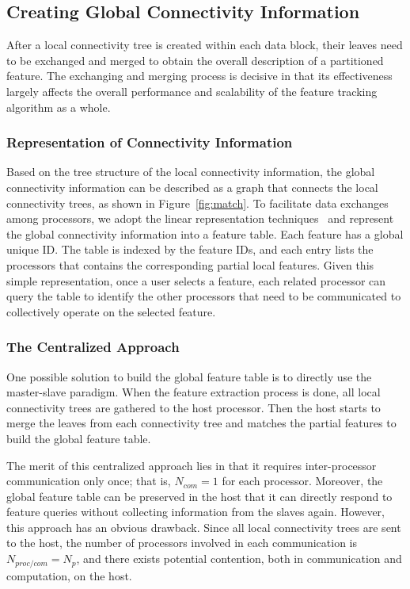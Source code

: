 \subsection{Creating Global Connectivity Information}

After a local connectivity tree is created within each data block, their leaves need to be exchanged and merged to obtain the overall description of a partitioned feature. The exchanging and merging process is decisive in that its effectiveness largely affects the overall performance and scalability of the feature tracking algorithm as a whole.

\subsubsection{Representation of Connectivity Information}

Based on the tree structure of the local connectivity information, the global connectivity information can be described as a graph that connects the local connectivity trees, as shown in Figure~\ref{fig:match}. To facilitate data exchanges among processors, we adopt the linear representation techniques~\cite{AMET1990} and represent the global connectivity information into a feature table. Each feature has a global unique ID. The table is indexed by the feature IDs, and each entry lists the processors that contains the corresponding partial local features. Given this simple representation, once a user selects a feature, each related processor can query the table to identify the other processors that need to be communicated to collectively operate on the selected feature.

\subsubsection{The Centralized Approach}

One possible solution to build the global feature table is to directly use the master-slave paradigm. When the feature extraction process is done, all local connectivity trees are gathered to the host processor. Then the host starts to merge the leaves from each connectivity tree and matches the partial features to build the global feature table.

The merit of this centralized approach lies in that it requires inter-processor communication only once; that is, $N_{com} = 1$ for each processor. Moreover, the global feature table can be preserved in the host that it can directly respond to feature queries without collecting information from the slaves again. However, this approach has an obvious drawback. Since all local connectivity trees are sent to the host, the number of processors involved in each communication is $N_{proc/com} = N_p$, and there exists potential contention, both in communication and computation, on the host.

